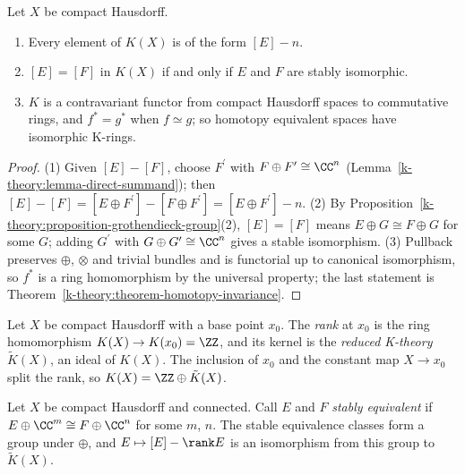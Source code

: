 \begin{proposition}\label{k-theory:proposition-k-elements}
Let $X$ be compact Hausdorff.
\begin{enumerate}
\item Every element of $K(X)$ is of the form $[E] - n$.
\item $[E] = [F]$ in $K(X)$ if and only if $E$ and $F$ are stably isomorphic.
\item $K$ is a contravariant functor from compact Hausdorff spaces to commutative rings, and $f^* = g^*$ when $f \simeq g$; so homotopy equivalent spaces have isomorphic K-rings.
\end{enumerate}
\end{proposition}

\begin{proof}
(1) Given $[E] - [F]$, choose $F^{\prime}$ with $F \oplus F^{\prime} \cong \CC^n$ (Lemma~\ref{k-theory:lemma-direct-summand}); then $[E] - [F] = [E \oplus F^{\prime}] - [F \oplus F^{\prime}] = [E \oplus F^{\prime}] - n$.
(2) By Proposition~\ref{k-theory:proposition-grothendieck-group}(2), $[E] = [F]$ means $E \oplus G \cong F \oplus G$ for some $G$; adding $G^{\prime}$ with $G \oplus G^{\prime} \cong \CC^n$ gives a stable isomorphism.
(3) Pullback preserves $\oplus$, $\otimes$ and trivial bundles and is functorial up to canonical isomorphism, so $f^*$ is a ring homomorphism by the universal property; the last statement is
Theorem~\ref{k-theory:theorem-homotopy-invariance}.
\end{proof}

\begin{definition}\label{k-theory:definition-reduced}
Let $X$ be compact Hausdorff with a base point $x_0$. The \emph{rank} at $x_0$ is the ring homomorphism $K(X) \to K(x_0) = \ZZ$, and its kernel is the \emph{reduced K-theory} $\tilde{K}(X)$, an ideal of $K(X)$.
The inclusion of $x_0$ and the constant map $X \to x_0$ split the rank, so $K(X) = \ZZ \oplus \tilde{K}(X)$.
\end{definition}

\begin{proposition}\label{k-theory:proposition-reduced-stable}
Let $X$ be compact Hausdorff and connected. Call $E$ and $F$ \emph{stably equivalent} if $E \oplus \CC^m \cong F \oplus \CC^n$ for some $m$, $n$. The stable equivalence classes form a group under $\oplus$, and
$E \mapsto [E] - \rank E$ is an isomorphism from this group to $\tilde{K}(X)$.
\end{proposition}

